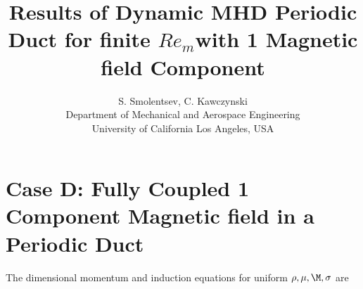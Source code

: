 \documentclass[11pt]{article}
\begin{document}
\doublespacing
\title{Results of Dynamic MHD Periodic Duct for finite
 \texorpdfstring{$Re_m$} \\ with 1 Magnetic field Component}
\author{S. Smolentsev, C. Kawczynski \\
Department of Mechanical and Aerospace Engineering \\
University of California Los Angeles, USA\\
}
\maketitle


\section{Case D: Fully Coupled 1 Component Magnetic field in a Periodic Duct}

The dimensional momentum and induction equations for uniform $\rho,\mu,\M,\sigma$ are
\end{document}
